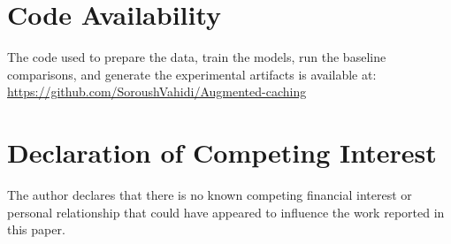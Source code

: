 \documentclass[preprint,12pt]{elsarticle}
\begin{document}
\section*{Code Availability}

The code used to prepare the data, train the models, run the baseline comparisons, and generate the experimental artifacts is available at:
\url{https://github.com/SoroushVahidi/Augmented-caching}

\section*{Declaration of Competing Interest}

The author declares that there is no known competing financial interest or personal relationship that could have appeared to influence the work reported in this paper.



\end{document}
